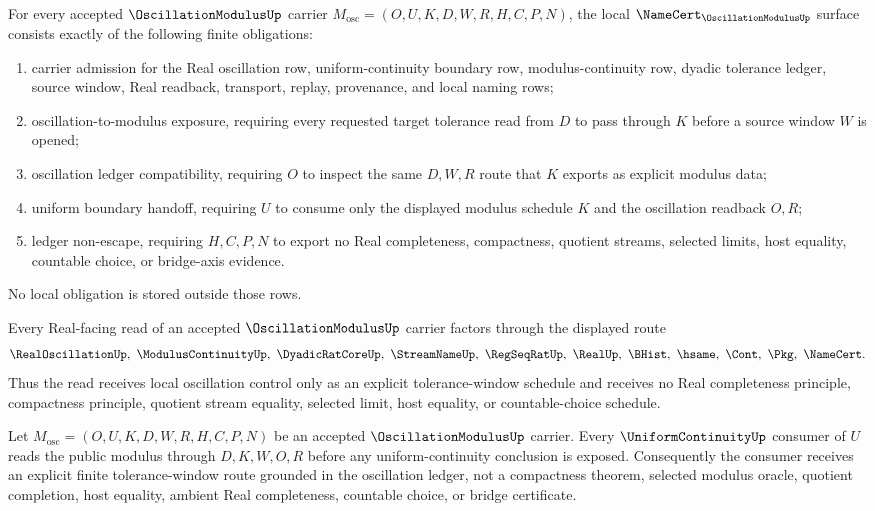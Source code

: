 \begin{theorem}
\label{thm:oscillation-modulus-namecert-obligations}
For every accepted $\OscillationModulusUp$ carrier $M_{\mathrm{osc}}=(O,U,K,D,W,R,H,C,P,N)$, the local $\NameCert_{\OscillationModulusUp}$ surface consists exactly of the following finite obligations:
\begin{enumerate}
\item carrier admission for the Real oscillation row, uniform-continuity boundary row, modulus-continuity row, dyadic tolerance ledger, source window, Real readback, transport, replay, provenance, and local naming rows;
\item oscillation-to-modulus exposure, requiring every requested target tolerance read from $D$ to pass through $K$ before a source window $W$ is opened;
\item oscillation ledger compatibility, requiring $O$ to inspect the same $D,W,R$ route that $K$ exports as explicit modulus data;
\item uniform boundary handoff, requiring $U$ to consume only the displayed modulus schedule $K$ and the oscillation readback $O,R$;
\item ledger non-escape, requiring $H,C,P,N$ to export no Real completeness, compactness, quotient streams, selected limits, host equality, countable choice, or bridge-axis evidence.
\end{enumerate}
No local obligation is stored outside those rows.
\end{theorem}

\begin{theorem}
\label{thm:oscillation-modulus-real-oscillation-handoff}
Every Real-facing read of an accepted $\OscillationModulusUp$ carrier factors through the displayed route
$$
\RealOscillationUp,\ \ModulusContinuityUp,\ \DyadicRatCoreUp,\ \StreamNameUp,\ \RegSeqRatUp,\ \RealUp,\ \BHist,\ \hsame,\ \Cont,\ \Pkg,\ \NameCert .
$$
Thus the read receives local oscillation control only as an explicit tolerance-window schedule and receives no Real completeness principle, compactness principle, quotient stream equality, selected limit, host equality, or countable-choice schedule.
\end{theorem}

\begin{theorem}
\label{thm:oscillation-modulus-uniform-continuity-boundary}
Let $M_{\mathrm{osc}}=(O,U,K,D,W,R,H,C,P,N)$ be an accepted $\OscillationModulusUp$ carrier. Every $\UniformContinuityUp$ consumer of $U$ reads the public modulus through $D,K,W,O,R$ before any uniform-continuity conclusion is exposed. Consequently the consumer receives an explicit finite tolerance-window route grounded in the oscillation ledger, not a compactness theorem, selected modulus oracle, quotient completion, host equality, ambient Real completeness, countable choice, or bridge certificate.
\end{theorem}

